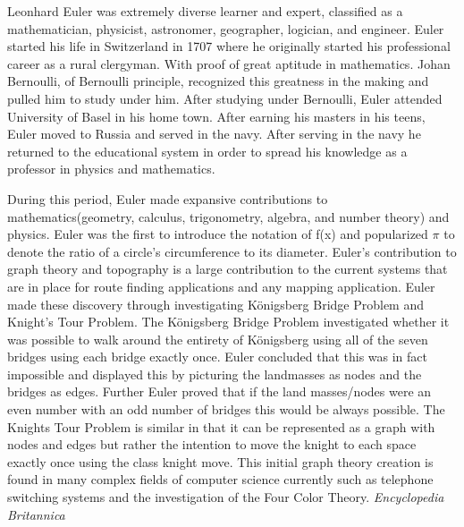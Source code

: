 \documentclass{article}
\begin{document}
Leonhard Euler was extremely diverse learner and expert, classified as a
mathematician, physicist, astronomer, geographer, logician, and engineer.
Euler started his life in Switzerland in 1707 where he originally started his
professional career as a rural clergyman. With proof of great aptitude in
mathematics. Johan Bernoulli, of Bernoulli principle, recognized this greatness
in the making and pulled him to study under him. After studying under Bernoulli,
Euler attended University of Basel in his home town. After earning his masters
in his teens, Euler moved to Russia and served in the navy. After serving in the
navy he returned to the educational system in order to spread his knowledge as a
professor in physics and mathematics.

During this period, Euler made expansive contributions to mathematics(geometry,
calculus, trigonometry, algebra, and number theory) and physics. Euler was the
first to introduce the notation of f(x) and popularized $\pi$ to denote the ratio
of a circle's circumference to its diameter. Euler's contribution to graph theory
and topography is a large contribution to the current systems that are in place
for route finding applications and any mapping application. Euler made these
discovery through investigating Königsberg Bridge Problem and Knight's Tour Problem.
The Königsberg Bridge Problem investigated whether it was possible to walk around
the entirety of Königsberg using all of the seven bridges using each bridge exactly
once. Euler concluded that this was in fact impossible and displayed this by picturing
the landmasses as nodes and the bridges as edges. Further Euler proved that if
the land masses/nodes were an even number with an odd number of bridges this
would be always possible. The Knights Tour Problem is similar
in that it can be represented as a graph with nodes and edges but rather the
intention to move the knight to each space exactly once using the class knight
move. This initial graph theory creation is found in many complex fields of computer
science currently such as telephone switching systems and the investigation of
the Four Color Theory.
\emph{Encyclopedia}~\cite{encyclopedia}
\emph{Britannica}~\cite{britannica}


 \newpage
 
 
\end{document}

